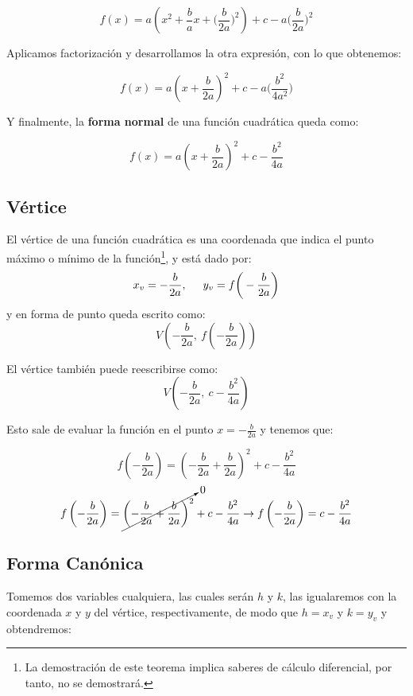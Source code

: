 \documentclass[A4paper, 10pt, oneside]{book}
\begin{document}
	$$f(x)=a\left(x^2+\frac{b}{a}x+\bigg(\frac{b}{2a}\bigg)^2\right)+c-a\bigg(\frac{b}{2a}\bigg)^2$$
	
	Aplicamos factorización y desarrollamos la otra expresión, con lo que obtenemos: 
	
	$$f(x)=a\left(x+\frac{b}{2a}\right)^2+c-a\bigg(\frac{b^2}{4a^2}\bigg)$$
	
	Y finalmente, la \textbf{forma normal} de una función cuadrática queda como: 
	
	\begin{tcolorbox}[colback=white]
		$$f(x)=a\left(x+\frac{b}{2a}\right)^2+c-\frac{b^2}{4a}$$
	\end{tcolorbox}
	
	\subsection{Vértice}
	
	\begin{tcolorbox}[title=Teorema, colback=white]
		El vértice de una función cuadrática es una coordenada que indica el punto máximo o mínimo de la función\footnote{La demostración de este teorema implica saberes de cálculo diferencial, por tanto, no se demostrará.}, y está dado por: $$x_v = -\frac{b}{2a}, \hspace{5mm} y_v = f\bigg(-\frac{b}{2a}\bigg)$$ y en forma de punto queda escrito como: $$V\left(-\frac{b}{2a}, \ f\left(-\frac{b}{2a}\right)\right)$$
	\end{tcolorbox}
	
	El vértice también puede reescribirse como: 
	$$V\left(-\frac{b}{2a}, \ c-\frac{b^2}{4a}\right)$$
	
	Esto sale de evaluar la función en el punto $\displaystyle{x=-\frac{b}{2a}}$ y tenemos que: 
	
	$$f\left(-\frac{b}{2a}\right) = \left(-\frac{b}{2a}+\frac{b}{2a}\right)^2+c-\frac{b^2}{4a}$$
	$$f\left(-\frac{b}{2a}\right) = \cancelto{0}{\left(-\frac{b}{2a}+\frac{b}{2a}\right)^2}+c-\frac{b^2}{4a} \rightarrow f\left(-\frac{b}{2a}\right) = c-\frac{b^2}{4a}$$
	
	\subsection{Forma Canónica}
	
	Tomemos dos variables cualquiera, las cuales serán $h$ y $k$, las igualaremos con la coordenada $x$ y $y$ del vértice, respectivamente, de modo que $h=x_v$ y $k=y_v$ y obtendremos:\newline 
	
\end{document}
